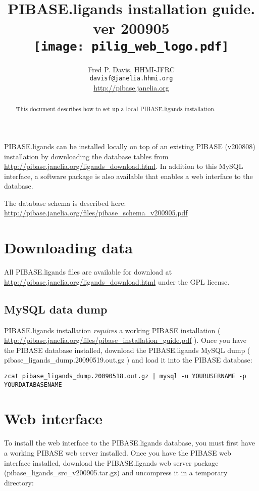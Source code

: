 \documentclass[11pt]{article}
\title{PIBASE.ligands installation guide. ver 200905\\
\texttt{[image: pilig\_web\_logo.pdf]}}
\author{Fred P. Davis, HHMI-JFRC\\{\tt davisf@janelia.hhmi.org}\\\url{http://pibase.janelia.org}}
\begin{document}
\maketitle

\begin{abstract}
This document describes how to set up a local PIBASE.ligands installation.
\end{abstract}

PIBASE.ligands can be installed locally on top of an existing PIBASE (v200808) installation by downloading the database tables from \url{http://pibase.janelia.org/ligands_download.html}. In addition to this MySQL interface, a software package is also available that enables a web interface to the database.

The database schema is described here: \url{http://pibase.janelia.org/files/pibase_schema_v200905.pdf}

\section{Downloading data}

All PIBASE.ligands files are available for download at \url{http://pibase.janelia.org/ligands_download.html} under the GPL license.

\subsection{MySQL data dump}

PIBASE.ligands installation {\em requires} a working PIBASE installation ( \url{http://pibase.janelia.org/files/pibase_installation_guide.pdf} ). Once you have the PIBASE database installed, download the PIBASE.ligands MySQL dump ( pibase\_ligands\_dump.20090519.out.gz ) and load it into the PIBASE database:

\begin{verbatim}
zcat pibase_ligands_dump.20090518.out.gz | mysql -u YOURUSERNAME -p YOURDATABASENAME
\end{verbatim}

\section{Web interface}

To install the web interface to the PIBASE.ligands database, you must first have a working PIBASE web server installed. Once you have the PIBASE web interface installed, download the PIBASE.ligands web server package (pibase\_ligands\_src\_v200905.tar.gz) and uncompress it in a temporary directory:
\end{document}
